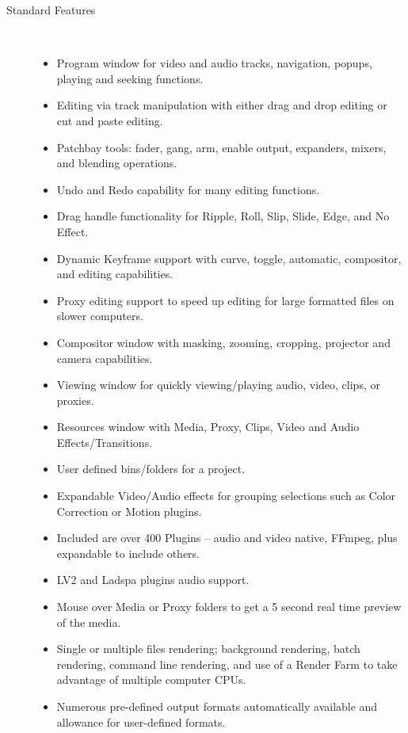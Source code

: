 \begin{description}
        \item[Standard Features]~\\
            \begin{itemize}
                \item Program window for video and audio tracks, navigation, popups, playing and seeking functions.
                \item Editing via track manipulation with either drag and drop editing or cut and paste editing.
                \item  Patchbay tools: fader, gang, arm, enable output, expanders, mixers, and blending operations.
                \item Undo and Redo capability for many editing functions.
                \item Drag handle functionality for Ripple, Roll, Slip, Slide, Edge, and No Effect.
                \item Dynamic Keyframe support with curve, toggle, automatic, compositor, and editing capabilities.
                \item Proxy editing support to speed up editing for large formatted files on slower computers.
                \item Compositor window with masking, zooming, cropping, projector and camera capabilities.
                \item Viewing window for quickly viewing/playing audio, video, clips, or proxies.
                \item Resources window with Media, Proxy, Clips, Video and Audio Effects/Transitions.
                \item User defined bins/folders for a project.
                \item Expandable Video/Audio effects for grouping selections such as Color Correction or Motion plugins.
                \item Included are over 400 Plugins – audio and video native, FFmpeg, plus expandable to include others.
                \item LV2 and Ladspa plugins audio support.
                \item Mouse over Media or Proxy folders to get a 5 second real time preview of the media.
                \item Single or multiple files rendering; background rendering, batch rendering, command line rendering, and use of a Render Farm to take advantage of multiple computer CPUs.
                \item Numerous pre-defined output formats automatically available and allowance for user-defined formats.

\end{itemize}
\end{description}
